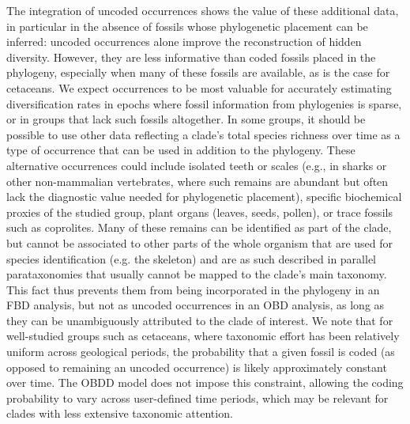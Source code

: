 \documentclass[oupdraft]{sysbio}
\newcommand{\revised}[1]{{\color{blue} #1}}
\begin{document}
The integration of \revised{uncoded} occurrences shows the value of these additional data, in particular in the absence of fossils whose phylogenetic placement can be inferred: \revised{uncoded} occurrences alone improve the reconstruction of hidden diversity. However, they are less informative than \revised{coded} fossils placed in the phylogeny, especially when many of these fossils are available, as is the case for cetaceans. We expect occurrences to be most valuable for accurately estimating diversification rates in epochs where fossil information from phylogenies is sparse, or in groups that lack such fossils altogether. In some groups, it should be possible to use other data reflecting a clade's total species richness over time as a type of occurrence that can be used in addition to the phylogeny. \revised{These alternative occurrences could include isolated teeth or scales (e.g., in sharks or other non-mammalian vertebrates, where such remains are abundant but often lack the diagnostic value needed for phylogenetic placement), specific biochemical proxies of the studied group, plant organs (leaves, seeds, pollen), or trace fossils such as coprolites.} Many of these remains can be identified as part of the clade, but cannot be associated to other parts of the whole organism that are used for species identification (e.g. the skeleton) and are as such described in parallel parataxonomies that usually cannot be mapped to the clade's main taxonomy. This fact thus prevents them from being incorporated in the phylogeny in an FBD analysis, but not as \revised{uncoded} occurrences in an OBD analysis, as long as they can be unambiguously attributed to the clade of interest. \revised{We note that for well-studied groups such as cetaceans, where taxonomic effort has been relatively uniform across geological periods, the probability that a given fossil is coded (as opposed to remaining an uncoded occurrence) is likely approximately constant over time. The OBDD model does not impose this constraint, allowing the coding probability to vary across user-defined time periods, which may be relevant for clades with less extensive taxonomic attention.}
\end{document}
